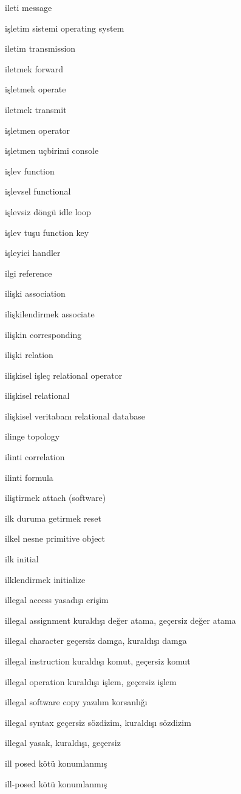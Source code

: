\documentclass[12pt,fleqn]{article}\usepackage{../../common}
\begin{document}
ileti message

işletim sistemi operating system

iletim transmission

iletmek forward

işletmek operate

iletmek transmit

işletmen operator

işletmen uçbirimi console

işlev function

işlevsel functional

işlevsiz döngü idle loop

işlev tuşu function key

işleyici handler

ilgi reference

ilişki association

ilişkilendirmek associate

ilişkin corresponding

ilişki relation

ilişkisel işleç relational operator

ilişkisel relational

ilişkisel veritabanı relational database

ilinge topology

ilinti correlation

ilinti formula

iliştirmek attach (software)

ilk duruma getirmek reset

ilkel nesne primitive object

ilk initial

ilklendirmek initialize

illegal access yasadışı erişim

illegal assignment kuraldışı değer atama, geçersiz değer atama

illegal character geçersiz damga, kuraldışı damga

illegal instruction kuraldışı komut, geçersiz komut

illegal operation kuraldışı işlem, geçersiz işlem

illegal software copy yazılım korsanlığı

illegal syntax geçersiz sözdizim, kuraldışı sözdizim

illegal yasak, kuraldışı, geçersiz

ill posed kötü konumlanmış

ill-posed kötü konumlanmış
\end{document}
